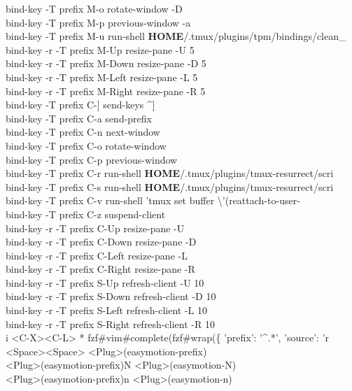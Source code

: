 \documentclass[11pt,a4paper,twoside]{book}
\begin{document}
bind-key  -T prefix  M-o  rotate-window -D\\
bind-key  -T prefix  M-p  previous-window -a\\
bind-key  -T prefix  M-u  run-shell \textbf{HOME}/.tmux/plugins/tpm/bindings/clean\_\\
bind-key -r -T prefix  M-Up  resize-pane -U 5\\
bind-key -r -T prefix  M-Down  resize-pane -D 5\\
bind-key -r -T prefix  M-Left  resize-pane -L 5\\
bind-key -r -T prefix  M-Right  resize-pane -R 5\\
bind-key  -T prefix  C-]  send-keys \textasciicircum{}]\\
bind-key  -T prefix  C-a  send-prefix\\
bind-key  -T prefix  C-n  next-window\\
bind-key  -T prefix  C-o  rotate-window\\
bind-key  -T prefix  C-p  previous-window\\
bind-key  -T prefix  C-r  run-shell \textbf{HOME}/.tmux/plugins/tmux-resurrect/scri\\
bind-key  -T prefix  C-s  run-shell \textbf{HOME}/.tmux/plugins/tmux-resurrect/scri\\
bind-key  -T prefix  C-v  run-shell 'tmux set buffer \textbackslash{}'(reattach-to-user-\\
bind-key  -T prefix  C-z  suspend-client\\
bind-key -r -T prefix  C-Up  resize-pane -U\\
bind-key -r -T prefix  C-Down  resize-pane -D\\
bind-key -r -T prefix  C-Left  resize-pane -L\\
bind-key -r -T prefix  C-Right  resize-pane -R\\
bind-key -r -T prefix  S-Up  refresh-client -U 10\\
bind-key -r -T prefix  S-Down  refresh-client -D 10\\
bind-key -r -T prefix  S-Left  refresh-client -L 10\\
bind-key -r -T prefix  S-Right  refresh-client -R 10\\
i  <C-X><C-L>  * fzf\#vim\#complete(fzf\#wrap(\{ 'prefix': '\textasciicircum{}.*', 'source': 'r\\
<Space><Space>  <Plug>(easymotion-prefix)\\
<Plug>(easymotion-prefix)N  <Plug>(easymotion-N)\\
<Plug>(easymotion-prefix)n  <Plug>(easymotion-n)\\
\end{document}
